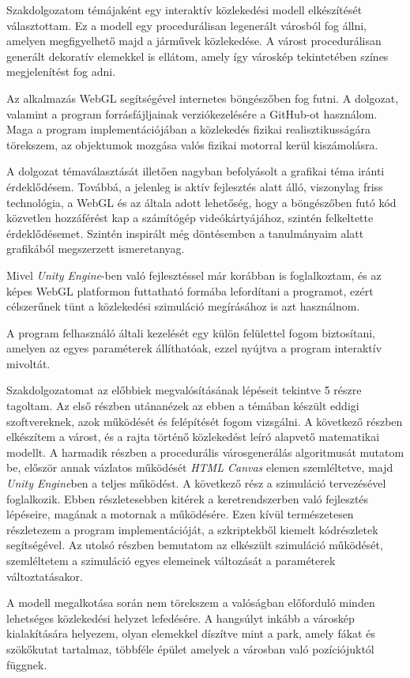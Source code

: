 
Szakdolgozatom témájaként egy interaktív közlekedési modell elkészítését választottam. Ez a modell egy procedurálisan legenerált városból fog állni, amelyen megfigyelhető majd a járművek közlekedése. A várost procedurálisan generált dekoratív elemekkel is ellátom, amely így városkép tekintetében színes megjelenítést fog adni. 

Az alkalmazás WebGL segítségével internetes böngészőben fog futni.
A dolgozat, valamint a program forrásfájljainak verziókezelésére a GitHub-ot használom.
Maga a program implementációjában a közlekedés fizikai realisztikusságára törekszem, az objektumok mozgása valós fizikai motorral kerül kiszámolásra.

A dolgozat témaválasztását illetően nagyban befolyásolt a grafikai téma iránti érdeklődésem. Továbbá, a jelenleg is aktív fejlesztés alatt álló, viszonylag friss technológia, a WebGL és az általa adott lehetőség, hogy a böngészőben futó kód közvetlen hozzáférést kap a számítógép videókártyájához, szintén felkeltette érdeklődésemet. Szintén inspirált még döntésemben a tanulmányaim alatt grafikából megszerzett ismeretanyag.

Mivel \textit{Unity Engine}-ben való fejlesztéssel már korábban is foglalkoztam, és az képes WebGL platformon futtatható formába lefordítani a programot, ezért célszerűnek tünt a közlekedési szimuláció megírásához is azt használnom.

A program felhasználó általi kezelését egy külön felülettel fogom biztosítani, amelyen az egyes paraméterek állíthatóak, ezzel nyújtva a program interaktív mivoltát.

Szakdolgozatomat az előbbiek megvalósításának lépéseit tekintve 5 részre tagoltam. Az első részben utánanézek az ebben a témában készült eddigi szoftvereknek, azok működését és felépítését fogom vizsgálni. 
A következő részben elkészítem a várost, és a rajta történő közlekedést leíró alapvető matematikai modellt. 
A harmadik részben a procedurális városgenerálás algoritmusát mutatom be, először annak vázlatos működését \textit{HTML Canvas} elemen szemléltetve, majd \textit{Unity Engine}ben a teljes működést. 
A következő rész a szimuláció tervezésével foglalkozik. Ebben részletesebben kitérek a keretrendszerben való fejlesztés lépéseire, magának a motornak a működésére. Ezen kívül természetesen részletezem a program implementációját, a szkriptekből kiemelt kódrészletek segítségével.
Az utolsó részben bemutatom az elkészült szimuláció működését, szemléltetem a szimuláció egyes elemeinek változását a paraméterek változtatásakor.

A modell megalkotása során nem törekszem a valóságban előforduló minden lehetséges közlekedési helyzet lefedésére. A hangsúlyt inkább a városkép kialakítására helyezem, olyan elemekkel díszítve mint a park, amely fákat és szökőkutat tartalmaz, többféle épület amelyek a városban való pozíciójuktól függnek.